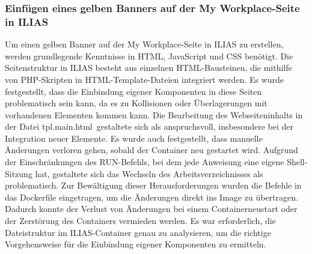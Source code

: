 \documentclass[10pt, a4paper,onecolumn ,titlepage]{article}
\begin{document}
    \subsubsection{Einfügen eines gelben Banners auf der \glqq My Workplace\grqq-Seite in ILIAS}
    \label{subsubsec:lessonslearnedHTTP}
    Um einen gelben Banner auf der \glqq My Workplace\grqq-Seite in ILIAS zu erstellen, werden grundlegende Kenntnisse in HTML, JavaScript und CSS benötigt.
    Die Seitenstruktur in ILIAS besteht aus einzelnen HTML-Bausteinen, die mithilfe von PHP-Skripten in HTML-Template-Dateien integriert werden.
    Es wurde festgestellt, dass die Einbindung eigener Komponenten in diese Seiten problematisch sein kann, da es zu Kollisionen oder Überlagerungen mit vorhandenen Elementen kommen kann.
    Die Bearbeitung des Webseiteninhalts in der Datei \glqq tpl.main.html\grqq\ gestaltete sich als anspruchsvoll, insbesondere bei der Integration neuer Elemente.
    Es wurde auch festgestellt, dass manuelle Änderungen verloren gehen, sobald der Container neu gestartet wird.
    Aufgrund der Einschränkungen des \glqq RUN\grqq-Befehls, bei dem jede Anweisung eine eigene Shell-Sitzung hat, gestaltete sich das Wechseln des Arbeitsverzeichnisses als problematisch.
    Zur Bewältigung dieser Herausforderungen wurden die Befehle in das Dockerfile eingetragen, um die Änderungen direkt ins Image zu übertragen.
    Dadurch konnte der Verlust von Änderungen bei einem Containerneustart oder der Zerstörung des Containers vermieden werden.
    Es war erforderlich, die Dateistruktur im ILIAS-Container genau zu analysieren, um die richtige Vorgehensweise für die Einbindung eigener Komponenten zu ermitteln.
\end{document}
